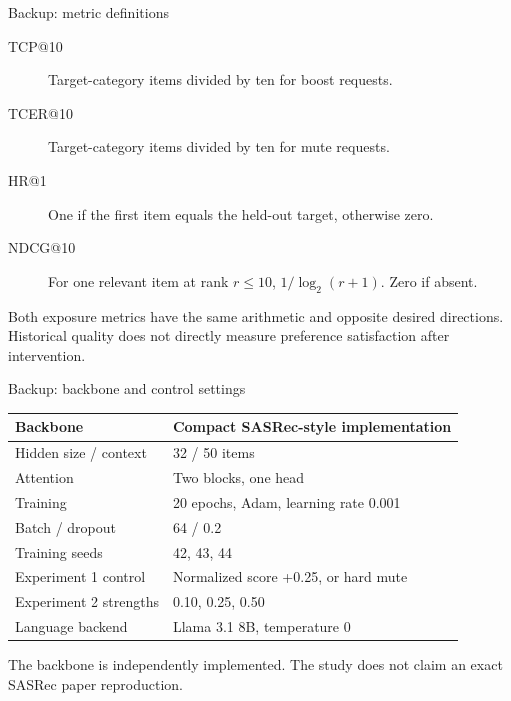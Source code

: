 \documentclass[10pt]{beamer}
\newcommand{\toprule}{\hline}
\newcommand{\midrule}{\hline}
\newcommand{\bottomrule}{\hline}
\newcommand{\src}[1]{\vfill{\tiny\color{bcitgray}#1}}
\begin{document}
\appendix
\begin{frame}{Backup: metric definitions}
\begin{description}
\item[TCP@10] Target-category items divided by ten for boost requests.
\item[TCER@10] Target-category items divided by ten for mute requests.
\item[HR@1] One if the first item equals the held-out target, otherwise zero.
\item[NDCG@10] For one relevant item at rank $r\leq10$, $1/\log_2(r+1)$. Zero if absent.
\end{description}
\vspace{0.3cm}
Both exposure metrics have the same arithmetic and opposite desired directions. Historical quality does not directly measure preference satisfaction after intervention.
\end{frame}

\begin{frame}{Backup: backbone and control settings}
\begin{tabular}{@{}P{3.8cm}P{6.0cm}@{}}
\toprule
Backbone & Compact SASRec-style implementation\\\midrule
Hidden size / context & 32 / 50 items\\
Attention & Two blocks, one head\\
Training & 20 epochs, Adam, learning rate 0.001\\
Batch / dropout & 64 / 0.2\\
Training seeds & 42, 43, 44\\
Experiment 1 control & Normalized score +0.25, or hard mute\\
Experiment 2 strengths & 0.10, 0.25, 0.50\\
Language backend & Llama 3.1 8B, temperature 0\\\bottomrule
\end{tabular}\par
\src{The backbone is independently implemented. The study does not claim an exact SASRec paper reproduction.}
\end{frame}
\end{document}
